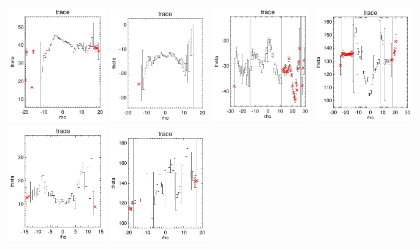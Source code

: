 \documentclass[fleqn,usenatbib]{mnras}
\begin{document}
\begin{figure}
    \centering
    \includegraphics[width=0.23\textwidth]{Images/trace-plots/trace-plots-cpsb-controls/8084-6103.png}    \includegraphics[width=0.23\textwidth]{Images/trace-plots/trace-plots-cpsb-controls/8262-3703.png}
    \includegraphics[width=0.23\textwidth]{Images/trace-plots/trace-plots-cpsb-controls/8262-12701.png}
    \includegraphics[width=0.23\textwidth]{Images/trace-plots/trace-plots-cpsb-controls/8335-12704.png}
    \includegraphics[width=0.23\textwidth]{Images/trace-plots/trace-plots-cpsb-controls/8442-3704.png}
    \includegraphics[width=0.23\textwidth]{Images/trace-plots/trace-plots-cpsb-controls/8461-9102.png}

\end{figure}
\end{document}
